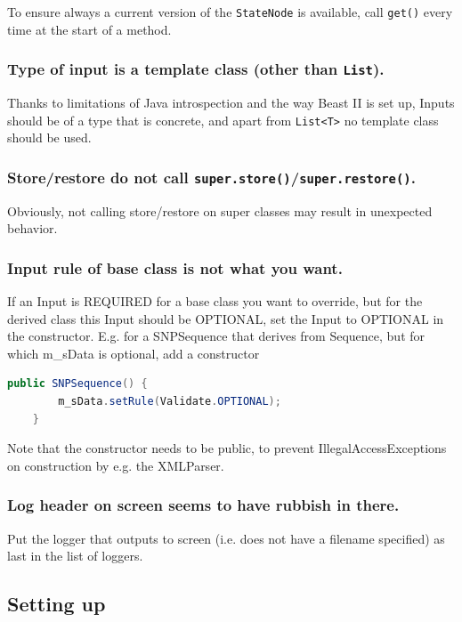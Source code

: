 \documentclass{article}
\begin{document}
To ensure always a current version of the {\tt StateNode} is available, call
{\tt get()} every time at the start of a method.


\subsubsection{Type of input is a template class (other than {\tt List}).}

Thanks to limitations of Java introspection and the way Beast II is set up, Inputs should be 
of a type that is concrete, and apart from {\tt List<T>} no template class should be used.

\subsubsection{Store/restore do not call {\tt super.store()}/{\tt super.restore()}.}

Obviously, not calling store/restore on super classes may result in unexpected behavior.

\subsubsection{Input rule of base class is not what you want.}

If an Input is REQUIRED for a base class you want to override, but for the derived
class this Input should be OPTIONAL, set the Input to OPTIONAL in the constructor.
E.g. for a SNPSequence that derives from Sequence, but for which m\_sData is optional,
add a constructor

{\color{blue}\begin{lstlisting}[language=java]
	public SNPSequence() {
		m_sData.setRule(Validate.OPTIONAL);
	}
\end{lstlisting}}
Note that the constructor needs to be public, to prevent IllegalAccessExceptions
on construction by e.g. the XMLParser.


\subsubsection{Log header on screen seems to have rubbish in there.}

Put the logger that outputs to screen (i.e. does not have a filename specified)
as last in the list of loggers.

\subsection{Setting up}
\end{document}
